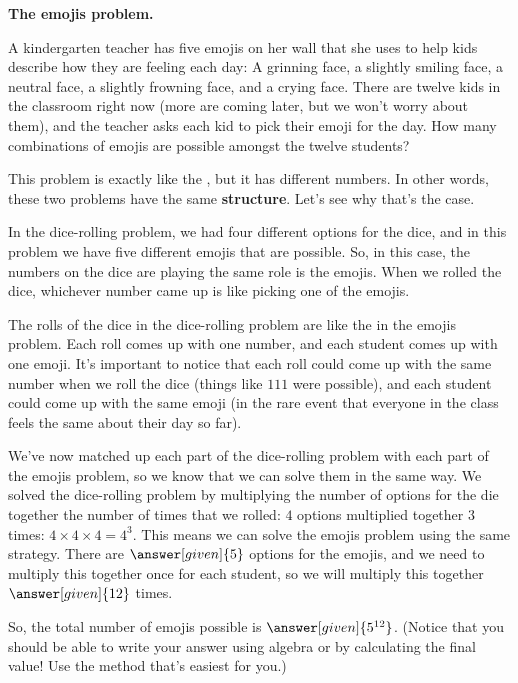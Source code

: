 \documentclass{ximera}
\begin{document}
\begin{question}{\bf The emojis problem.}

A kindergarten teacher has five emojis on her wall that she uses to help kids describe how they are feeling each day: A grinning face, a slightly smiling face, a neutral face, a slightly frowning face, and a crying face. There are twelve kids in the classroom right now (more are coming later, but we won't worry about them), and the teacher asks each kid to pick their emoji for the day. How many combinations of emojis are possible amongst the twelve students?

\begin{explanation}
This problem is exactly like the , but it has different numbers. In other words, these two problems have the same {\bf structure}. Let's see why that's the case.

In the dice-rolling problem, we had four different options for the dice, and in this problem we have five different emojis that are possible. So, in this case, the numbers on the dice are playing the same role is the emojis. When we rolled the dice, whichever number came up is like picking one of the emojis.

The rolls of the dice in the dice-rolling problem are like the  in the emojis problem. Each roll comes up with one number, and each student comes up with one emoji. It's important to notice that each roll could come up with the same number when we roll the dice (things like $111$ were possible), and each student could come up with the same emoji (in the rare event that everyone in the class feels the same about their day so far).

We've now matched up each part of the dice-rolling problem with each part of the emojis problem, so we know that we can solve them in the same way. We solved the dice-rolling problem by multiplying the number of options for the die together the number of times that we rolled: $4$ options multiplied together $3$ times: $4 \times 4 \times 4 = 4^3$. This means we can solve the emojis problem using the same strategy. There are $\answer[given]{5}$ options for the emojis, and we need to multiply this together once for each student, so we will multiply this together $\answer[given]{12}$ times.



So, the total number of emojis possible is $\answer[given]{5^{12}}$. (Notice that you should be able to write your answer using algebra or by calculating the final value! Use the method that's easiest for you.)

\end{explanation}
\end{question}
\end{document}
